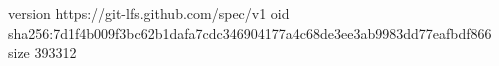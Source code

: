 version https://git-lfs.github.com/spec/v1
oid sha256:7d1f4b009f3bc62b1dafa7cdc346904177a4c68de3ee3ab9983dd77eafbdf866
size 393312
